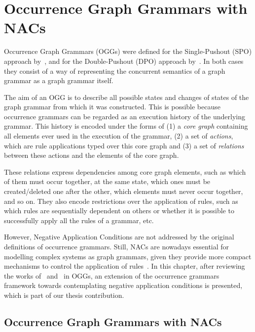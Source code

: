 \chapter{Occurrence Graph Grammars with NACs}\label{ch:process}

Occurrence Graph Grammars (OGGs) were defined for the Single-Pushout (SPO) approach by~\cite{Ribeiro1996}, and for the Double-Pushout (DPO) approach by~\cite{Corradini1996}. In both cases they consist of a way of representing the concurrent semantics of a graph grammar as a graph grammar itself.

  The aim of an OGG is to describe all possible states and changes of states of the graph grammar from which it was constructed.
  This is possible because occurrence grammars can be regarded as an execution history of the underlying grammar.
  This history is encoded under the forms of (1) a \emph{core graph} containing all elements ever used in the execution of the grammar, (2) a set of \emph{actions}, which are rule applications typed over this core graph and (3) a set of \emph{relations} between these actions and the elements of the core graph.

  These relations express dependencies among core graph elements, such as which of them must occur together, at the same state, which ones must be created/deleted one after the other, which elements must never occur together, and so on.
  They also encode restrictions over the application of rules, such as which rules are sequentially dependent on others or whether it is possible to successfully apply all the rules of a grammar, etc.

  However, Negative Application Conditions are not addressed by the original definitions of occurrence grammars.
    Still, NACs are nowadays essential for modelling complex systems as graph grammars, given they provide more compact mechanisms to control the application of rules~\cite{Habel1996, Lambers2008, Corradini2014}.
      In this chapter, after reviewing the works of~\cite{Ribeiro1996} and~\cite{Corradini1996} in OGGs, an extension of the occurrence grammars framework towards contemplating negative application conditions is presented, which is part of our thesis contribution.

\section{Occurrence Graph Grammars with NACs}

